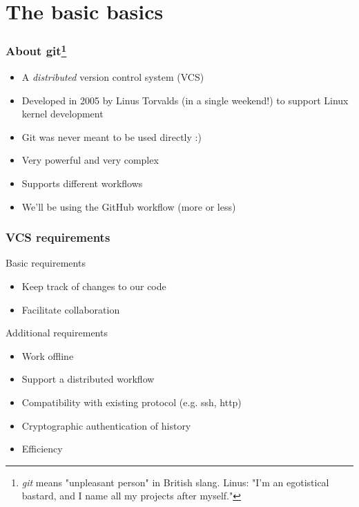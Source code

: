 \section{The basic basics}

\begin{frame}

\frametitle{About git\footnote{\emph{git} means "unpleasant person" in British slang. Linus: "I'm an egotistical\\bastard, and I name all my projects after myself."}}
	
\begin{itemize}
	\item A \emph{distributed} version control system (VCS) 
	\item Developed in 2005 by Linus Torvalds (in a single weekend!) to support Linux kernel development
	\item Git was never meant to be used directly :)
	\item Very powerful and very complex
	\item Supports different workflows
	\item We'll be using the GitHub workflow (more or less)	
\end{itemize}
	
\end{frame}


\begin{frame}

\frametitle{VCS requirements}
	
\begin{block}{Basic requirements}
	\begin{itemize}
		\item Keep track of changes to our code
		\item Facilitate collaboration
	\end{itemize}
\end{block}
	
\begin{block}{Additional requirements}
	\begin{itemize}
		\item Work offline
		\item Support a distributed workflow
		\item Compatibility with existing protocol (e.g. ssh, http)
		\item Cryptographic authentication of history
		\item Efficiency
	\end{itemize}
\end{block}

\end{frame}


